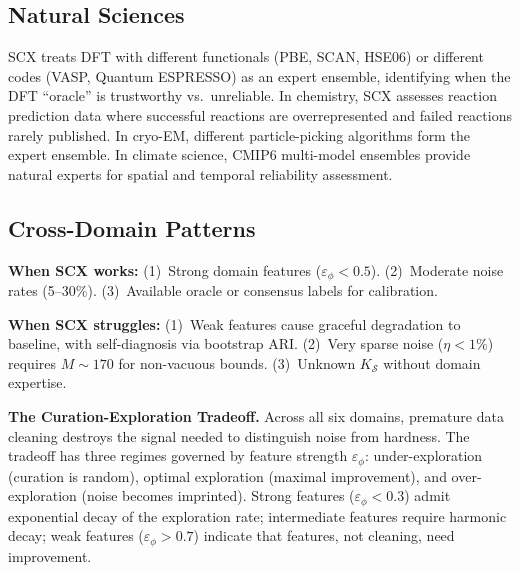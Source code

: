 \documentclass[twocolumn]{article}
\theoremstyle{definition}
\begin{document}
\vspace{0.3cm}
\subsection{Natural Sciences}

SCX treats DFT with different functionals (PBE, SCAN, HSE06) or different codes (VASP, Quantum ESPRESSO) as an expert ensemble, identifying when the DFT ``oracle'' is trustworthy vs.\ unreliable. In chemistry, SCX assesses reaction prediction data where successful reactions are overrepresented and failed reactions rarely published. In cryo-EM, different particle-picking algorithms form the expert ensemble. In climate science, CMIP6 multi-model ensembles provide natural experts for spatial and temporal reliability assessment.

\subsection{Cross-Domain Patterns}
\label{sec:tradeoff}

\textbf{When SCX works:} (1)~Strong domain features ($\varepsilon_\phi < 0.5$). (2)~Moderate noise rates (5--30\%). (3)~Available oracle or consensus labels for calibration.

\textbf{When SCX struggles:} (1)~Weak features cause graceful degradation to baseline, with self-diagnosis via bootstrap ARI. (2)~Very sparse noise ($\eta < 1\%$) requires $M \sim 170$ for non-vacuous bounds. (3)~Unknown $K_{\mathcal{S}}$ without domain expertise.

\textbf{The Curation-Exploration Tradeoff.} Across all six domains, premature data cleaning destroys the signal needed to distinguish noise from hardness. The tradeoff has three regimes governed by feature strength $\varepsilon_\phi$: under-exploration (curation is random), optimal exploration (maximal improvement), and over-exploration (noise becomes imprinted). Strong features ($\varepsilon_\phi < 0.3$) admit exponential decay of the exploration rate; intermediate features require harmonic decay; weak features ($\varepsilon_\phi > 0.7$) indicate that features, not cleaning, need improvement.

\end{document}
